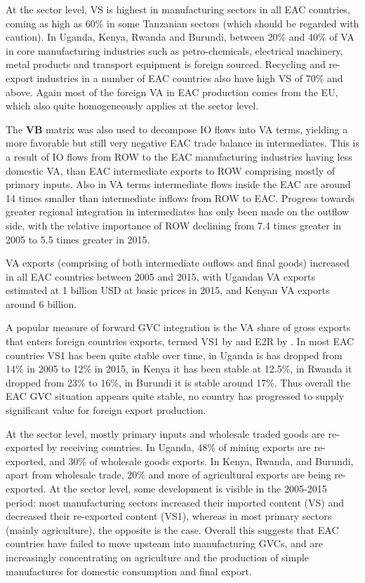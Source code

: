 \documentclass[a4paper]{article}
\begin{document}
 At the sector level, VS is highest in manufacturing sectors in all EAC countries, coming as high as 60\% in some Tanzanian sectors (which should be regarded with caution). In Uganda, Kenya, Rwanda and Burundi, between 20\% and 40\% of VA in core manufacturing industries such as petro-chemicals, electrical machinery, metal products and transport equipment is foreign sourced. Recycling and re-export industries in a number of EAC countries also have high VS of 70\% and above. Again most of the foreign VA in EAC production comes from the EU, which also quite homogeneously applies at the sector level. \newline
 
The \textbf{VB} matrix was also used to decompose IO flows into VA terms, yielding a more favorable but still very negative EAC trade balance in intermediates. This is a result of IO flows from ROW to the EAC manufacturing industries having less domestic VA, than EAC intermediate exports to ROW comprising mostly of primary inputs. Also in VA terms intermediate flows inside the EAC are around 14 times smaller than intermediate inflows from ROW to EAC. Progress towards greater regional integration in intermediates has only been made on the outflow side, with the relative
importance of ROW declining from 7.4 times greater in 2005 to 5.5 times greater in 2015. \newline 

VA exports (comprising of both intermediate ouflows and final goods) increased in all EAC countries between 2005 and 2015, with Ugandan VA exports estimated at 1 billion USD at basic prices in 2015, and Kenyan VA exports around 6 billion. \newline 

A popular measure of forward GVC integration is the VA share of gross exports that enters foreign countries exports, termed VS1 by \citet{hummels2001nature} and E2R by \citet{baldwin2015supply}. In most EAC countries VS1 has been quite stable over time, in Uganda is has dropped from 14\% in 2005 to 12\% in 2015, in Kenya it has been stable at 12.5\%, in Rwanda it dropped from 23\% to 16\%, in Burundi it is stable around 17\%. Thus overall the EAC GVC situation appears quite stable, no country has progressed to supply significant value for foreign export production. \newline

At the sector level, mostly primary inputs and wholesale traded goods are re-exported by receiving countries. In Uganda, 48\% of mining exports are re-exported, and 30\% of wholesale goods exports. In Kenya, Rwanda, and Burundi, apart from wholesale trade, 20\% and more of agricultural exports are being re-exported. At the sector level, some development is visible in the 2005-2015 period: most manufacturing sectors increased their imported content (VS) and decreased their re-exported content (VS1), whereas in most primary sectors (mainly agriculture), the opposite is the case. Overall this suggests that EAC countries have failed to move upsteam into manufacturing GVCs, and are increasingly concentrating on agriculture and the production of simple manufactures for domestic consumption and final export. \newline
\end{document}
